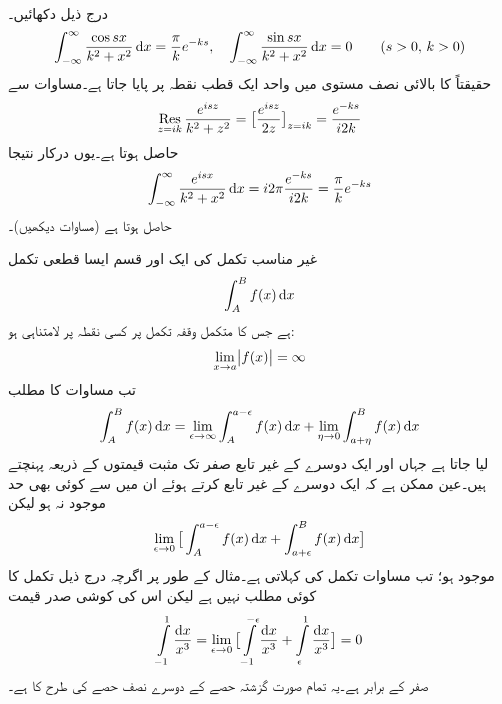 \quad {}\\
درج ذیل دکھائیں۔
\begin{align*}
\int_{-\infty}^{\infty} \frac{\cos sx}{k^2+x^2}\dif x=\frac{\pi}{k}e^{-ks},\quad \int_{-\infty}^{\infty} \frac{\sin sx}{k^2+x^2}\dif x=0\quad \quad (s>0,\, k>0)
\end{align*}
حقیقتاً  کا بالائی نصف مستوی میں واحد ایک قطب نقطہ  پر پایا جاتا ہے۔مساوات  سے
\begin{align*}
\underset{z=ik\hfill}{\Res} \,\frac{e^{isz}}{k^2+z^2}=\big[\frac{e^{isz}}{2z}\big]_{z=ik}=\frac{e^{-ks}}{i2k}
\end{align*}
حاصل ہوتا ہے۔یوں درکار نتیجا
\begin{align*}
\int_{-\infty}^{\infty} \frac{e^{isx}}{k^2+x^2}\dif x=i2\pi \frac{e^{-ks}}{i2k}=\frac{\pi}{k}e^{-ks}
\end{align*}
حاصل ہوتا ہے (مساوات  دیکھیں)۔

غیر مناسب تکمل کی ایک اور قسم  ایسا قطعی تکمل
\begin{align}\label{مساوات_بقیہ_غیر_مناسب_الف}
\int_A^B f(x)\dif x
\end{align}
ہے جس کا متکمل وقفہ تکمل پر کسی نقطہ  پر لامتناہی ہو:
\begin{align*}
\lim_{x\to a} \abs{f(x)}=\infty
\end{align*}
تب مساوات  کا مطلب
\begin{align}\label{مساوات_بقیہ_غیر_مناسب_ب}
\int_A^B f(x)\dif x=\lim_{\epsilon\to \infty}\int_A^{a-\epsilon}f(x)\dif x+\lim_{\eta\to 0}\int_{a+\eta}^B f(x)\dif x
\end{align}
لیا جاتا ہے  جہاں  اور  ایک دوسرے کے غیر تابع صفر تک مثبت قیمتوں کے ذریعہ پہنچتے ہیں۔عین ممکن ہے کہ ایک دوسرے کے غیر تابع  کرتے ہوئے ان میں سے کوئی بھی حد موجود نہ ہو لیکن
\begin{align}\label{مساوات_بقیہ_غیر_مناسب_پ}
\lim_{\epsilon\to 0}\big[\int_A^{a-\epsilon}f(x)\dif x+\int_{a+\epsilon}^B f(x)\dif x\big]
\end{align}
موجود ہو؛ تب  مساوات  تکمل کی  کہلاتی ہے۔مثال کے طور پر اگرچہ درج ذیل تکمل کا کوئی مطلب نہیں ہے لیکن اس کی کوشی صدر قیمت
\begin{align*}
\int\limits_{-1}^{1}\frac{\dif x}{x^3}=\lim_{\epsilon\to 0}\big[\int\limits_{-1}^{-\epsilon} \frac{\dif x}{x^3}+\int\limits_{\epsilon}^{1}\frac{\dif x}{x^3}\big]=0
\end{align*}
صفر کے برابر ہے۔یہ تمام صورت  گزشتہ حصے کے دوسرے نصف حصے کی طرح کا ہے۔

